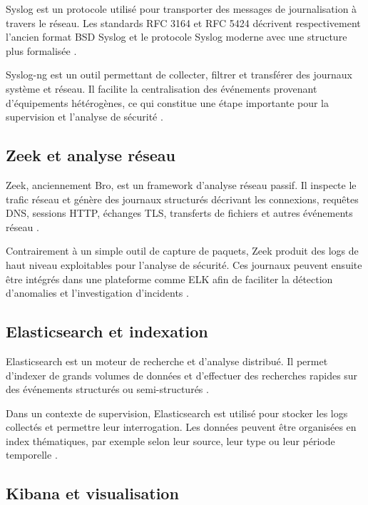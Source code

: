 \documentclass[12pt,a4paper,oneside]{report}
\begin{document}
	Syslog est un protocole utilisé pour transporter des messages de journalisation à travers le réseau. Les standards RFC 3164 et RFC 5424 décrivent respectivement l'ancien format BSD Syslog et le protocole Syslog moderne avec une structure plus formalisée \cite{rfc3164_syslog,rfc5424_syslog}.
	
	Syslog-ng est un outil permettant de collecter, filtrer et transférer des journaux système et réseau. Il facilite la centralisation des événements provenant d'équipements hétérogènes, ce qui constitue une étape importante pour la supervision et l'analyse de sécurité \cite{rfc5424_syslog}.
	
	\subsection{Zeek et analyse réseau}
	
	Zeek, anciennement Bro, est un framework d'analyse réseau passif. Il inspecte le trafic réseau et génère des journaux structurés décrivant les connexions, requêtes DNS, sessions HTTP, échanges TLS, transferts de fichiers et autres événements réseau \cite{zeek_docs}.
	
	Contrairement à un simple outil de capture de paquets, Zeek produit des logs de haut niveau exploitables pour l'analyse de sécurité. Ces journaux peuvent ensuite être intégrés dans une plateforme comme ELK afin de faciliter la détection d'anomalies et l'investigation d'incidents \cite{zeek_docs,elastic_stack_docs}.
	
	\subsection{Elasticsearch et indexation}
	
	Elasticsearch est un moteur de recherche et d'analyse distribué. Il permet d'indexer de grands volumes de données et d'effectuer des recherches rapides sur des événements structurés ou semi-structurés \cite{elastic_stack_docs}.
	
	Dans un contexte de supervision, Elasticsearch est utilisé pour stocker les logs collectés et permettre leur interrogation. Les données peuvent être organisées en index thématiques, par exemple selon leur source, leur type ou leur période temporelle \cite{elastic_stack_docs}.
	
	\subsection{Kibana et visualisation}
	
\end{document}
